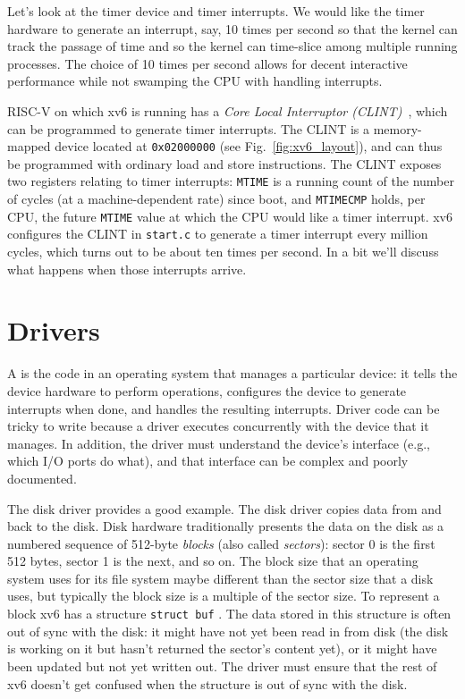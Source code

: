 Let's look at the timer device and timer interrupts.  We would like
the timer hardware to generate an interrupt, say, 10 times per
second so that the kernel can track the passage of time and so the
kernel can time-slice among multiple running processes.  The choice of
10 times per second allows for decent interactive performance while
not swamping the CPU with handling interrupts.

RISC-V on which xv6 is running has a \textit{Core Local
  Interruptor (CLINT)}~\cite{u54}, which
can be programmed to generate timer interrupts.  The CLINT is a
memory-mapped device located at \lstinline{0x02000000} (see
Fig.~\ref{fig:xv6_layout}), and can thus be programmed with ordinary
load and store instructions. The CLINT exposes two registers relating
to timer interrupts: {\tt MTIME} is a running count of the number of
cycles (at a machine-dependent rate) since boot, and {\tt MTIMECMP}
holds, per CPU, the future {\tt MTIME} value at which the CPU
would like a timer interrupt.
xv6 configures the CLINT in {\tt start.c}
to generate a timer interrupt
every million cycles, which turns out to be about ten times
per second. In a bit we'll discuss what happens when those
interrupts arrive.

\section{Drivers}

A
is the code in an operating system that manages a particular device:
it tells the device hardware to perform operations,
configures the device to generate interrupts when done,
and handles the resulting interrupts.
Driver code can be tricky to write
because a driver executes concurrently with the device that it manages.  In
addition, the driver must understand the device's interface (e.g., which I/O
ports do what), and that interface can be complex and poorly documented.

The disk driver provides a good example.  The disk driver copies data
from and back to the disk.  Disk hardware traditionally presents the data on the
disk as a numbered sequence of 512-byte 
\textit{blocks} 
(also called 
\textit{sectors}): 
sector 0 is the first 512 bytes, sector 1 is the next, and so on. The block size
that an operating system uses for its file system maybe different than the
sector size that a disk uses, but typically the block size is a multiple of the
sector size. To
represent a block xv6 has a structure
\lstinline{struct buf}
.
The
data stored in this structure is often out of sync with the disk: it might have
not yet been read in from disk (the disk is working on it but hasn't returned
the sector's content yet), or it might have been updated but not yet written
out.  The driver must ensure that the rest of xv6 doesn't get confused when the
structure is out of sync with the disk.

